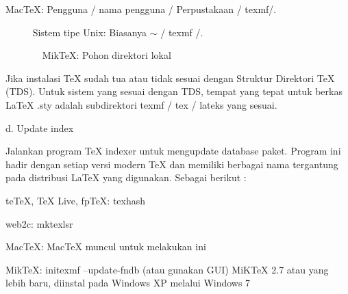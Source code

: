 \begin{enumerate}
MacTeX: Pengguna / nama pengguna / Perpustakaan / texmf/. \par     
Sistem tipe Unix: Biasanya  $ \sim $  / texmf /. \par       
MikTeX: Pohon direktori lokal \par

\vspace{8pt}
\hspace{0.50in}Jika instalasi TeX sudah tua atau tidak sesuai dengan Struktur Direktori TeX (TDS). Untuk sistem yang sesuai dengan TDS, tempat yang tepat untuk berkas LaTeX .sty adalah subdirektori texmf / tex / lateks yang sesuai.\par

\vspace{8pt}
\noindent d. Update index  \par
\hspace{0.50in} Jalankan program TeX indexer untuk mengupdate database paket. Program ini hadir dengan setiap versi modern TeX dan memiliki berbagai nama tergantung pada distribusi LaTeX yang digunakan. Sebagai berikut :\par

teTeX, TeX Live, fpTeX: texhash \par
web2c: mktexlsr \par
MacTeX: MacTeX muncul untuk melakukan ini \par
MikTeX: initexmf --update-fndb (atau gunakan GUI)
MiKTeX 2.7 atau yang lebih baru, diinstal pada Windows XP melalui Windows 7 \par


\end{enumerate}
